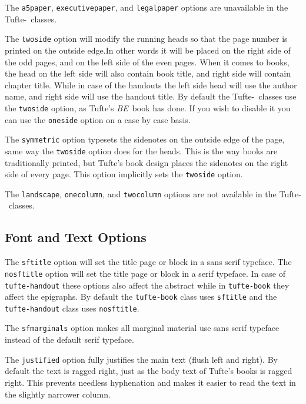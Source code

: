 \documentclass[a4paper]{tufte-handout}
\newcommand{\be}{\textit{BE}\xspace}
\newcommand{\TL}{Tufte-\hologo{LaTeX}\xspace}
\newcommand{\hlorange}[1]{\textcolor{tufte-orange}{#1}}
\newcommand{\doccls}[1]{\texttt{#1}}
\newcommand{\docclsopt}[1]{\hlorange{\texttt{#1}}}
\begin{document}
The \docclsopt{a5paper}, \docclsopt{executivepaper}, and \docclsopt{legalpaper} options are unavailable in the \TL\ classes.

The \docclsopt{twoside} option will modify the running heads so that the page number is printed on the outside edge.In other words it will be placed on the right side of the odd pages, and on the left side of the even pages.
When it comes to books, the head on the left side will also contain book title, and right side will contain chapter title.
While in case of the handouts the left side head will use the author name, and right side will use the handout title.
By default the \TL\ classes use the \docclsopt{twoside} option, as Tufte's \be\ book has done.\cite{Tufte2006}
If you wish to disable it you can use the \docclsopt{oneside} option on a case by case basis.

The \docclsopt{symmetric} option typesets the sidenotes on the outside edge of the page, same way the \docclsopt{twoside} option does for the heads.
This is the way books are traditionally printed, but Tufte's book design places the sidenotes on the right side of every page.
This option implicitly sets the \docclsopt{twoside} option.

The \docclsopt{landscape}, \docclsopt{onecolumn}, and \docclsopt{twocolumn} options are not available in the \TL\ classes.

\subsection{Font and Text Options}\label{ssec:font-text-options}
The \docclsopt{sftitle} option will set the title page or block in a \textsf{sans serif} typeface.
The \docclsopt{nosftitle} option will set the title page or block in a serif typeface.
In case of \doccls{tufte-handout} these options also affect the abstract while in \doccls{tufte-book} they affect the epigraphs.
By default the \doccls{tufte-book} class uses \docclsopt{sftitle} and the \doccls{tufte-handout} class uses \docclsopt{nosftitle}.

The \docclsopt{sfmarginals} option makes all marginal material use \textsf{sans serif} typeface instead of the default serif typeface.

The \docclsopt{justified} option fully justifies the main text (flush left and right). 
By default the text is ragged right, just as the body text of Tufte's books is ragged right. 
This prevents needless hyphenation and makes it easier to read the text in the slightly narrower column.
\end{document}
